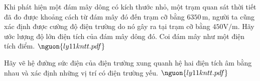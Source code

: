 \begin{ex}
Khi phát hiện một đám mây dông có kích thước nhỏ, một trạm quan sát thời tiết đã đo được khoảng cách từ đám mây đó đến trạm cỡ bằng $6350\,\text{m}$, người ta cũng xác định được cường độ điện trường do nó gây ra tại trạm cỡ bằng $450 \mathrm{V/m}$. Hãy ước lượng độ lớn điện tích của đám mây dông đó. Coi đám mây như một điện tích điểm. $\nguon{ly11 kntt.pdf}$
\choiceTF

\end{ex}

\begin{ex}
Hãy vẽ hệ đường sức điện của điện trường xung quanh hệ hai điện tích âm bằng nhau và xác định những vị trí có điện trường yếu. $\nguon{ly11 kntt.pdf}$
\choiceTF

\end{ex}

